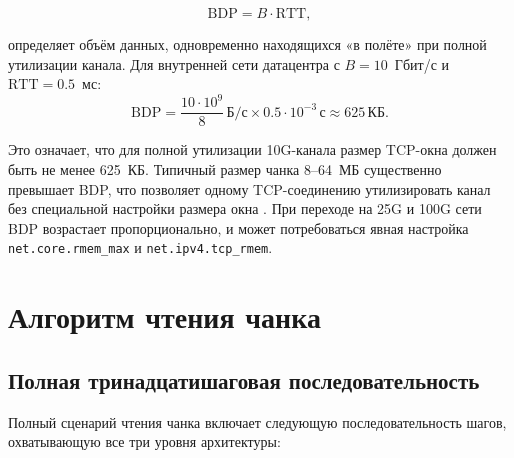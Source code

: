 \begin{equation}
\mathrm{BDP} = B \cdot \mathrm{RTT},
\label{eq:bdp}
\end{equation}

определяет объём данных, одновременно находящихся «в полёте» при полной утилизации канала. Для внутренней сети датацентра с $B = 10$~Гбит/с и $\mathrm{RTT} = 0.5$~мс:
\[
\mathrm{BDP} = \frac{10 \cdot 10^9}{8}\,\text{Б/с} \times 0.5 \cdot 10^{-3}\,\text{с} \approx 625\,\text{КБ}.
\]

Это означает, что для полной утилизации 10G-канала размер TCP-окна должен быть не менее 625~КБ. Типичный размер чанка 8--64~МБ существенно превышает BDP, что позволяет одному TCP-соединению утилизировать канал без специальной настройки размера окна \cite{hennessy2011ca}. При переходе на 25G и 100G сети BDP возрастает пропорционально, и может потребоваться явная настройка \texttt{net.core.rmem\_max} и \texttt{net.ipv4.tcp\_rmem}.

\section{Алгоритм чтения чанка}

\subsection*{Полная тринадцатишаговая последовательность}

Полный сценарий чтения чанка включает следующую последовательность шагов, охватывающую все три уровня архитектуры:

